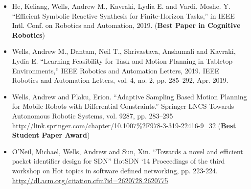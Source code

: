 \begin{itemize}
\item[]{He, Keliang, Wells, Andrew M., Kavraki, Lydia E. and Vardi, Moshe. Y.  “Efficient Symbolic Reactive Synthesis for Finite-Horizon Tasks,” in IEEE Intl. Conf. on Robotics and Automation, 2019. (\textbf{Best Paper in Cognitive Robotics})}

\vspace{1em} 

\item[]{Wells, Andrew M., Dantam, Neil T., Shrivastava, Anshumali and Kavraki, Lydia E.  “Learning Feasibility for Task and Motion Planning in Tabletop Environments,” IEEE Robotics and Automation Letters, 2019. IEEE Robotics and Automation Letters, vol. 4, no. 2, pp. 285–292, Apr. 2019.}

\vspace{1em} 

\item[]{Wells, Andrew and Plaku, Erion.  “Adaptive Sampling Based Motion Planning for Mobile Robots with Differential Constraints.” Springer LNCS Towards Autonomous Robotic Systems, vol. 9287, pp. 283–295 \url{http://link.springer.com/chapter/10.1007%2F978-3-319-22416-9_32} (\textbf{Best Student Paper Award})}

\vspace{1em} 

\item[]{O’Neil, Michael, Wells, Andrew and Sun, Xin. “Towards a novel and efficient packet identifier design for SDN” HotSDN ‘14 Proceedings of the third workshop on Hot topics in software defined networking, pp. 223-224. \url{http://dl.acm.org/citation.cfm?id=2620728.2620775}}

\end{itemize}